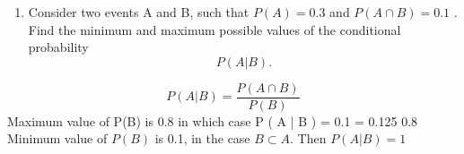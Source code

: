\documentclass[a4paper,12pt]{article}
\begin{document}
\begin{enumerate}
\item Consider two events A and B, such that $P ( A ) = 0.3$ and $P ( A \cap B ) = 0.1$ .
Find the minimum and maximum possible values of the conditional probability
\[P ( A | B ) .\]

\end{enumerate}
\newpage

\[P ( A | B ) = \frac{P ( A \cap B )}{P ( B )}\]
Maximum value of P(B) is 0.8 in which case P ( A | B ) =
0.1
= 0.125
0.8
Minimum value of $P(B)$ is 0.1, in the case $B \subset A$. Then $P ( A | B ) = 1$
\end{document}
